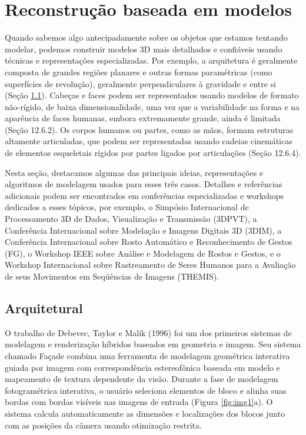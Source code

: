 \documentclass{article}
\begin{document}
\section{Reconstrução baseada em modelos}
Quando sabemos algo antecipadamente sobre os objetos que estamos tentando modelar, podemos construir modelos 3D mais detalhados e confiáveis usando técnicas e representações especializadas. Por exemplo, a arquitetura é geralmente composta de grandes regiões planares e outras formas paramétricas (como superfícies de revolução), geralmente perpendiculares à gravidade e entre si (Seção \ref{subsec:Arquitetural}). Cabeças e faces podem ser representados usando modelos de formato não-rígido, de baixa dimensionalidade, uma vez que a variabilidade na forma e na aparência de faces humanas, embora extremamente grande, ainda é limitada (Seção 12.6.2). Os corpos humanos ou partes, como as mãos, formam estruturas altamente articuladas, que podem ser representadas usando cadeias cinemáticas de elementos esqueletais rígidos por partes ligados por articulações (Seção 12.6.4).

Nesta seção, destacamos algumas das principais ideias, representações e algoritmos de modelagem usados para esses três casos. Detalhes e referências adicionais podem ser encontrados em conferências especializadas e workshops dedicados a esses tópicos, por exemplo, o Simpósio Internacional de Processamento 3D de Dados, Visualização e Transmissão (3DPVT), a Conferência Internacional sobre Modelação e Imagens Digitais 3D (3DIM), a Conferência Internacional sobre Rosto Automático e Reconhecimento de Gestos (FG), o Workshop IEEE sobre Análise e Modelagem de Rostos e Gestos, e o Workshop Internacional sobre Rastreamento de Seres Humanos para a Avaliação de seus Movimentos em Seqüências de Imagens (THEMIS).

\subsection{Arquitetural}
\label{subsec:Arquitetural}
O trabalho de Debevec, Taylor e Malik (1996)\cite{Debevec:1996:MRA:237170.237191} foi um dos primeiros sistemas de modelagem e renderização híbridos baseados em geometria e imagem. Seu sistema chamado Façade combina uma ferramenta de modelagem geométrica interativa guiada por imagem com correspondência estereofônica baseada em modelo e mapeamento de textura dependente da visão. Durante a fase de modelagem fotogramétrica interativa, o usuário seleciona elementos de bloco e alinha suas bordas com bordas visíveis nas imagens de entrada (Figura \ref{fig:img1}a). O sistema calcula automaticamente as dimensões e localizações dos blocos junto com as posições da câmera usando otimização restrita.
\end{document}

